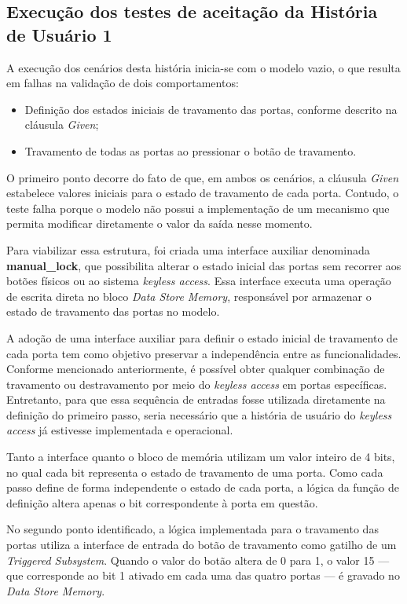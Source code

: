 \subsection{Execução dos testes de aceitação da História de Usuário 1}

A execução dos cenários desta história inicia-se com o modelo vazio, o que resulta em falhas na validação de dois comportamentos:

\begin{itemize}
	\item Definição dos estados iniciais de travamento das portas, conforme descrito na cláusula \textit{Given};
	\item Travamento de todas as portas ao pressionar o botão de travamento.
\end{itemize}

O primeiro ponto decorre do fato de que, em ambos os cenários, a cláusula \textit{Given} estabelece valores iniciais para o estado de travamento de cada porta. Contudo, 
o teste falha porque o modelo não possui a implementação de um mecanismo que permita modificar diretamente o valor da saída nesse momento.

Para viabilizar essa estrutura, foi criada uma interface auxiliar denominada \textbf{manual\_lock}, que possibilita alterar o estado inicial das portas sem recorrer aos 
botões físicos ou ao sistema \textit{keyless access}. Essa interface executa uma operação de escrita direta no bloco \textit{Data Store Memory}, responsável por armazenar o 
estado de travamento das portas no modelo.

A adoção de uma interface auxiliar para definir o estado inicial de travamento de cada porta tem como objetivo preservar a independência entre as funcionalidades. 
Conforme mencionado anteriormente, é possível obter qualquer combinação de travamento ou destravamento por meio do \textit{keyless access} em portas específicas. 
Entretanto, para que essa sequência de entradas fosse utilizada diretamente na definição do primeiro passo, seria necessário que a história de usuário do 
\textit{keyless access} já estivesse implementada e operacional.

Tanto a interface quanto o bloco de memória utilizam um valor inteiro de 4 bits, no qual cada bit representa o estado de travamento de uma porta. Como cada passo 
define de forma independente o estado de cada porta, a lógica da função de definição altera apenas o bit correspondente à porta em questão.

No segundo ponto identificado, a lógica implementada para o travamento das portas utiliza a interface de entrada do botão de travamento como gatilho de um 
\textit{Triggered Subsystem}. Quando o valor do botão altera de 0 para 1, o valor 15 — que corresponde ao bit 1 ativado em cada uma das quatro portas — é gravado 
no \textit{Data Store Memory}.

